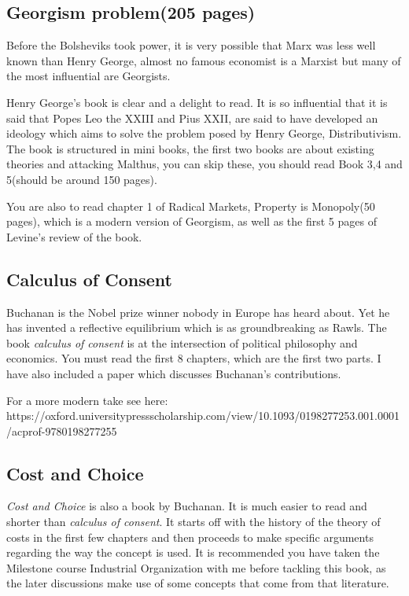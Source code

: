 \documentclass[12pt]{report}
\numberwithin{equation}{section}
\begin{document}
\subsection*{Georgism problem(205 pages)}

Before the Bolsheviks took power, it is very possible that Marx was less well known than Henry George, almost no famous economist is a Marxist but many of the most influential are Georgists. 

Henry George's book is clear and a delight to read. It is so influential that it is said that Popes Leo the XXIII and Pius XXII, are said to have developed an ideology which aims to solve the problem posed by Henry George, Distributivism. The book is structured in mini books, the first two books are about existing theories and attacking Malthus, you can skip these, you should read Book 3,4 and 5(should be around 150 pages).

You are also to read chapter 1 of Radical Markets, Property is Monopoly(50 pages), which is a modern version of Georgism, as well as the first 5 pages of Levine's review of the book. 

\subsection*{Calculus of Consent}

Buchanan is the Nobel prize winner nobody in Europe has heard about. Yet he has invented a reflective equilibrium which is as groundbreaking as Rawls. The book \textit{calculus of consent} is at the intersection of political philosophy and economics. You must read the first 8 chapters, which are the first two parts. I have also included a paper which discusses Buchanan's contributions. 

For a more modern take see here: \newline
https://oxford.universitypressscholarship.com/view/10.1093/0198277253.001.0001/acprof-9780198277255



\subsection*{Cost and Choice}

\textit{Cost and Choice} is also a book by Buchanan. It is much easier to read and shorter than \textit{calculus of consent}. It starts off with the history of the theory of costs in the first few chapters and then proceeds to make specific arguments regarding the way the concept is used. It is recommended you have taken the Milestone course Industrial Organization with me before tackling this book, as the later discussions make use of some concepts that come from that literature. 
\end{document}
